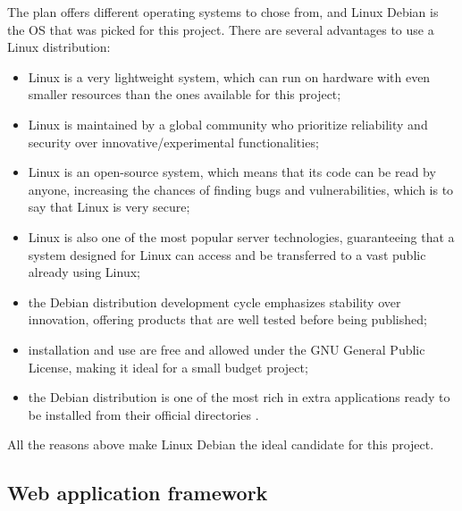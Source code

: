 The plan offers different operating systems to chose from, and Linux Debian is
the OS that was picked for this project. There are several advantages to use a
Linux distribution:
\begin{itemize}
  \item Linux is a very lightweight system, which can run on hardware with even
  smaller resources than the ones available for this project;
  \item Linux is maintained by a global community who prioritize reliability and
  security over innovative/experimental functionalities;
  \item Linux is an open-source system, which means that its code can be read by
  anyone, increasing the chances of finding bugs and vulnerabilities, which is
  to say that Linux is very secure;
  \item Linux is also one of the most popular server technologies, guaranteeing
  that a system designed for Linux can access and be transferred to a vast
  public already using Linux;
  \item the Debian distribution development cycle emphasizes stability over
  innovation, offering products that are well tested before being published;
  \item installation and use are free and allowed under the GNU General Public
  License, making it ideal for a small budget project;
  \item the Debian distribution is one of the most rich in extra applications
  ready to be installed from their official directories \cite{Debian}.
\end{itemize}

All the reasons above make Linux Debian the ideal candidate for this project.

\subsection{Web application framework}

